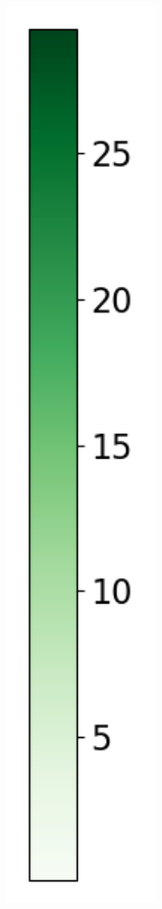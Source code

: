 \begin{figure}[H]
\begin{subfigure}[b]{0.075\textwidth}
        \includegraphics[width=1\textwidth]{Results/kd-laplace/piecewise/seeds-dataset/heatmap_legend_distance.png}
    \end{subfigure}
\end{figure}
